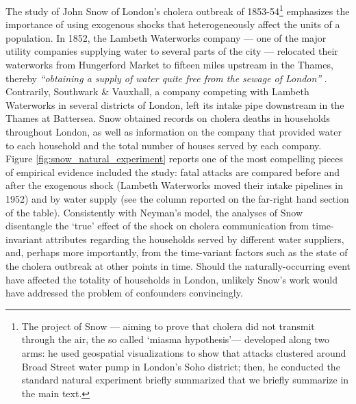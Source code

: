 \begin{refsection}
The study of John Snow of London's cholera outbreak of 1853-54\footnote{The
project of Snow --- aiming to prove that cholera did not transmit through the
air, the so called `miasma hypothesis'--- developed along two arms: he used
geospatial visualizations to show that attacks clustered around Broad Street
water pump in London's Soho district; then, he conducted the standard natural
experiment briefly summarized that we briefly summarize in the main text.}
emphasizes the importance of using exogenous shocks that heterogeneously affect
the units of a population. In 1852, the Lambeth Waterworks company --- one of
the major utility companies supplying water to several parts of the city ---
relocated their waterworks from Hungerford Market to fifteen miles upstream in
the Thames, thereby \textit{``obtaining a supply of water quite free from the
sewage of London''} \autocite[][page 68]{snow_1855}. Contrarily, Southwark \&
Vauxhall, a company competing with Lambeth Waterworks in several districts of
London, left its intake pipe downstream in the Thames at Battersea. Snow
obtained records on cholera deaths in households throughout London, as well as
information on the company that provided water to each household and the total
number of houses served by each company. Figure
\ref{fig:snow_natural_experiment} reports one of the most compelling pieces of
empirical evidence included the study: fatal attacks are compared before and
after the exogenous shock (Lambeth Waterworks moved their intake pipelines in
1952) and by water supply (see the column reported on the far-right hand section
of the table). Consistently with Neyman's model, the analyses of Snow disentangle
the `true' effect of the shock on cholera communication from time-invariant
attributes regarding the households served by different water suppliers, and,
perhaps more importantly, from the time-variant factors such as the state of the
cholera outbreak at other points in time. Should the naturally-occurring
event have affected the totality of households in London, unlikely Snow's work 
would have addressed the problem of confounders convincingly.  


\end{refsection}
